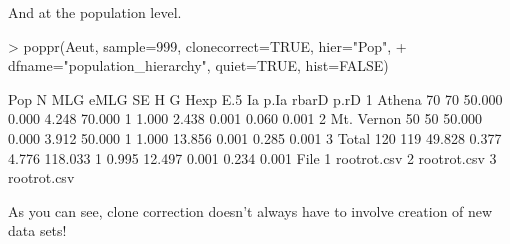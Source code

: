 \documentclass[letterpaper]{article}
\begin{document}
And at the population level.
\begin{Schunk}
\begin{Sinput}
> poppr(Aeut, sample=999, clonecorrect=TRUE, hier="Pop", 
+       dfname="population_hierarchy", quiet=TRUE, hist=FALSE)
\end{Sinput}
\end{Schunk}
\begin{Schunk}
\begin{Soutput}
         Pop   N MLG   eMLG    SE     H       G Hexp   E.5     Ia  p.Ia rbarD  p.rD
1     Athena  70  70 50.000 0.000 4.248  70.000    1 1.000  2.438 0.001 0.060 0.001
2 Mt. Vernon  50  50 50.000 0.000 3.912  50.000    1 1.000 13.856 0.001 0.285 0.001
3      Total 120 119 49.828 0.377 4.776 118.033    1 0.995 12.497 0.001 0.234 0.001
         File
1 rootrot.csv
2 rootrot.csv
3 rootrot.csv
\end{Soutput}
\end{Schunk}
As you can see, clone correction doesn't always have to involve creation of new data sets!
\end{document}
